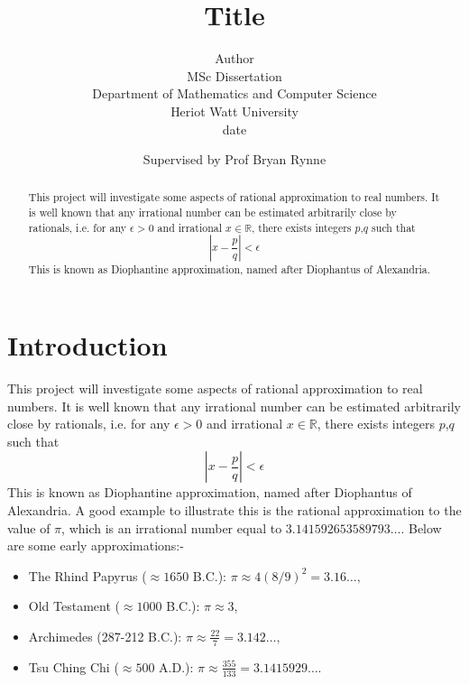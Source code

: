 \documentclass[reqno,openany,12pt]{amsbook}
\theoremstyle{definition}
\theoremstyle{remark}
\newcommand\ep{\epsilon}
\newcommand\R{\mathbb{R}}
\begin{document}
\title{Title}
\author{Author\\
{\small
MSc Dissertation\\[-1 ex]
Department of Mathematics and Computer Science\\[-1 ex]
Heriot Watt University\\[-1 ex]
date
}
}
\bigskip

\author{Supervised by Prof Bryan Rynne}


\begin{abstract}
This project will investigate some aspects of rational approximation to
real numbers.
It is well known that any irrational number can be estimated arbitrarily
close by rationals, i.e. for any $\ep>0$ and irrational $x \in \R$,
there exists integers $p$,$q$ such that
\begin{equation}  \label{abs_basic_app.eq}
\left| {x-\frac{p}{q}} \right| < \ep
\end{equation}
This is known as Diophantine approximation, named after Diophantus of
Alexandria.

\end{abstract}


\maketitle


 \setcounter{page}{0}


\tableofcontents


\chapter{Introduction}

This project will investigate some aspects of rational approximation to
real numbers.
It is well known that any irrational number can be estimated arbitrarily
close by rationals, i.e. for any $\ep>0$ and irrational $x \in \R$,
there exists integers $p$,$q$ such that
\begin{equation}\label{firsteq}
\left| {x-\frac{p}{q}} \right| < \ep
\end{equation}
This is known as Diophantine approximation, named after Diophantus of Alexandria.
A good example to illustrate this is the rational approximation to the
value of $\pi$, which is an irrational number equal to
$3.141592653589793\dots$.
Below are some early approximations:-
\bigskip
\begin{itemize}
\item
The Rhind Papyrus ($\approx 1650$ B.C.):
$\pi \approx 4(8/9)^2= 3.16\dots,$
\item
Old Testament ($\approx 1000$ B.C.): $\pi \approx 3$,
\item
Archimedes (287-212 B.C.): $\pi \approx \frac{22}{7} = 3.142\dots,$
\item
Tsu Ching Chi ($\approx 500$ A.D.):
$\pi \approx \frac{355}{133} = 3.1415929\dots.$
\end{itemize}
\bigskip
\end{document}

